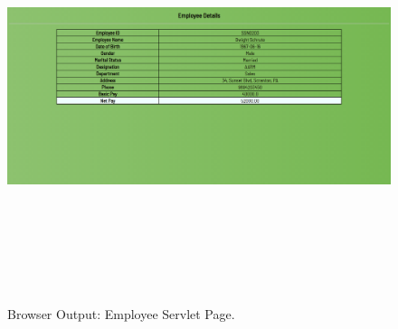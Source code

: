 \documentclass[12pt, a4]{article}
\begin{document}
\newpage
\subsection*{}
\begin{figure}[h]
\centering
\caption{Browser Output: Employee Servlet Page.}
\includegraphics[height=12cm, width=18cm]{Output/Employee2.png}
\end{figure}

\newpage
\subsection*{}
\begin{flushleft}

\end{flushleft}

\newpage
\subsection*{}
\begin{flushleft}

\end{flushleft}

\newpage
\subsection*{}
\begin{flushleft}

\end{flushleft}
\end{document}
